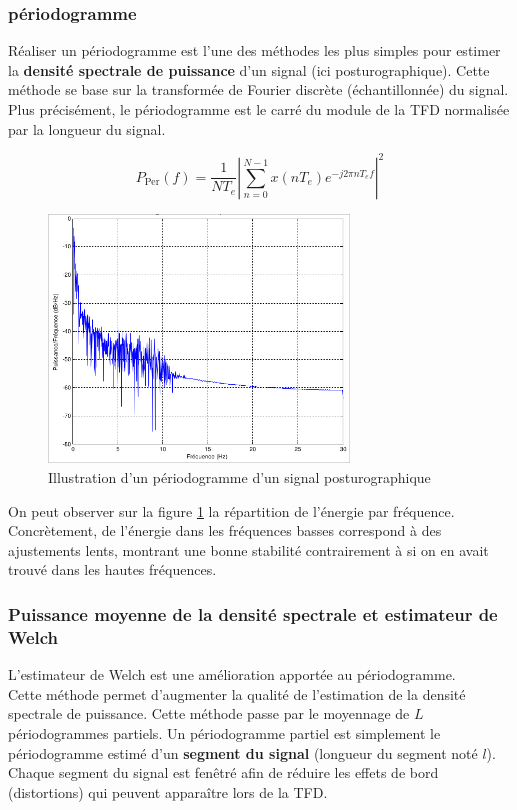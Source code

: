 \subsubsection{périodogramme}

Réaliser un périodogramme est l'une des méthodes les plus simples pour estimer la \textbf{densité spectrale de puissance} d'un signal (ici posturographique).
Cette méthode se base sur la transformée de Fourier discrète (échantillonnée) du signal.
Plus précisément, le périodogramme est le carré du module de la TFD normalisée par la longueur du signal.

\begin{equation}
  P_{\text{Per}}(f)=\frac{1}{NT_e}\left|\sum\limits_{n=0}^{N-1}x(nT_e)e^{-j2\pi nT_ef}\right|^2
  \label{eq:P_per}
\end{equation}

\begin{figure}[ht]
  \centering
  \includegraphics[width=8cm]{images/methode/periodogramme.png}
  \caption{Illustration d'un périodogramme d'un signal posturographique}
  \label{fig:periodogramme}
\end{figure}

On peut observer sur la figure \ref{fig:periodogramme} la répartition de l'énergie par fréquence.
Concrètement, de l'énergie dans les fréquences basses correspond à des ajustements lents, montrant une bonne stabilité contrairement à si on en avait trouvé dans les hautes fréquences.

\subsubsection{Puissance moyenne de la densité spectrale et estimateur de Welch}

L'estimateur de Welch est une amélioration apportée au périodogramme. \\
Cette méthode permet d'augmenter la qualité de l'estimation de la densité spectrale de puissance.
Cette méthode passe par le moyennage de $L$ périodogrammes partiels.
Un périodogramme partiel est simplement le périodogramme estimé d'un \textbf{segment du signal} (longueur du segment noté $l$).
Chaque segment du signal est fenêtré afin de réduire les effets de bord (distortions) qui peuvent apparaître lors de la TFD.

